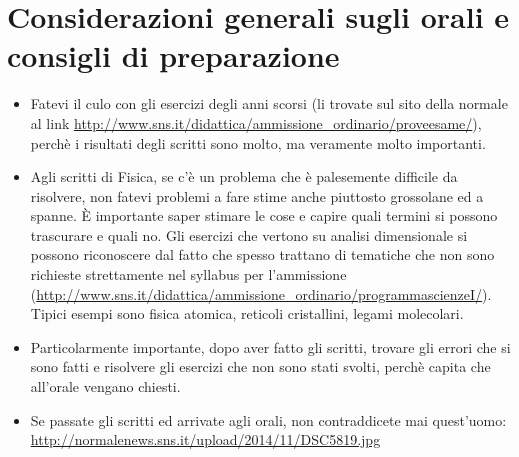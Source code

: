 \documentclass[a4paper,11pt]{article}
\begin{document}
\section*{Considerazioni generali sugli orali e consigli di preparazione}
\begin{itemize}
\item Fatevi il culo con gli esercizi degli anni scorsi (li trovate sul sito della normale al link \url{http://www.sns.it/didattica/ammissione_ordinario/proveesame/}), perch\`e i risultati degli scritti sono molto, ma veramente molto importanti.
\item Agli scritti di Fisica, se c'\`e un problema che \`e palesemente difficile da risolvere, non fatevi problemi a fare stime anche piuttosto grossolane ed a spanne. \`E importante saper stimare le cose e capire quali termini si possono trascurare e quali no. Gli esercizi che vertono su analisi dimensionale si possono riconoscere dal fatto che spesso trattano di tematiche che non sono richieste strettamente nel syllabus per l'ammissione (\url{http://www.sns.it/didattica/ammissione_ordinario/programmascienzeI/}). Tipici esempi sono fisica atomica, reticoli cristallini, legami molecolari.
\item Particolarmente importante, dopo aver fatto gli scritti, trovare gli errori che si sono fatti e risolvere gli esercizi che non sono stati svolti, perch\`e capita che all'orale vengano chiesti.
\item Se passate gli scritti ed arrivate agli orali, non contraddicete mai quest'uomo: \url{http://normalenews.sns.it/upload/2014/11/DSC5819.jpg}
\end{itemize}
\end{document}
